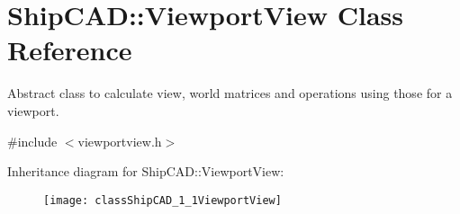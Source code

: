 \hypertarget{classShipCAD_1_1ViewportView}{}\section{Ship\+C\+AD\+:\+:Viewport\+View Class Reference}
\label{classShipCAD_1_1ViewportView}


Abstract class to calculate view, world matrices and operations using those for a viewport.  




{\ttfamily \#include $<$viewportview.\+h$>$}

Inheritance diagram for Ship\+C\+AD\+:\+:Viewport\+View\+:\begin{figure}[H]
\begin{center}
\leavevmode
\texttt{[image: classShipCAD\_1\_1ViewportView]}
\end{center}
\end{figure}
